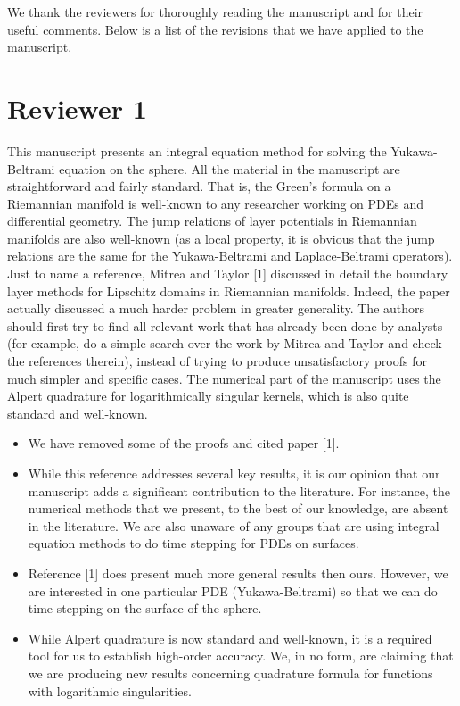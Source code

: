 \documentclass[11pt]{article}
\newcommand{\comment}[1]{{\color{blue} #1}}
\begin{document}
We thank the reviewers for thoroughly reading the manuscript and for
their useful comments.  Below is a list of the revisions that we have
applied to the manuscript.


\section*{Reviewer 1}

\comment{This manuscript presents an integral equation method for
solving the Yukawa-Beltrami equation on the sphere. All the material in
the manuscript are straightforward and fairly standard. That is, the
Green’s formula on a Riemannian manifold is well-known to any
researcher working on PDEs and differential geometry. The jump
relations of layer potentials in Riemannian manifolds are also
well-known (as a local property, it is obvious that the jump relations
are the same for the Yukawa-Beltrami and Laplace-Beltrami operators).
Just to name a reference, Mitrea and Taylor [1] discussed in detail the
boundary layer methods for Lipschitz domains in Riemannian manifolds.
Indeed, the paper actually discussed a much harder problem in greater
generality. The authors should first try to find all relevant work that
has already been done by analysts (for example, do a simple search over
the work by Mitrea and Taylor and check the references therein),
instead of trying to produce unsatisfactory proofs for much simpler and
specific cases. The numerical part of the manuscript uses the Alpert
quadrature for logarithmically singular kernels, which is also quite
standard and well-known.}
\begin{itemize}
  \item We have removed some of the proofs and cited paper [1].
  \item While this reference addresses several key results, it is our
  opinion that our manuscript adds a significant contribution to the
  literature.  For instance, the numerical methods that we present, to
  the best of our knowledge, are absent in the literature.  We are also
  unaware of any groups that are using integral equation methods to do
  time stepping for PDEs on surfaces.
  \item Reference [1] does present much more general results then ours.
  However, we are interested in one particular PDE (Yukawa-Beltrami) so
  that we can do time stepping on the surface of the sphere.
  \item While Alpert quadrature is now standard and well-known, it is a
  required tool for us to establish high-order accuracy.  We, in no
  form, are claiming that we are producing new results concerning
  quadrature formula for functions with logarithmic singularities.
 \end{itemize}
\end{document}
